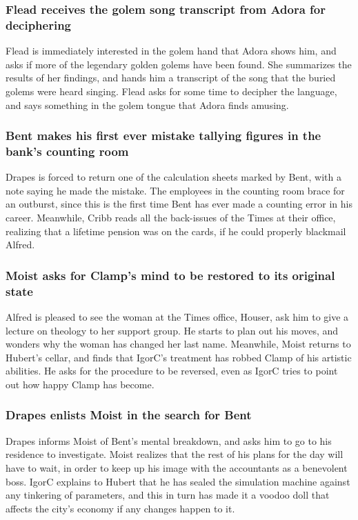 \subsubsection{\Gls{Flead} receives the golem song transcript from \Gls{Adora} for deciphering}
\Gls{Flead} is immediately interested in the golem hand that \Gls{Adora} shows him, and asks if
more of the legendary golden golems have been found. She summarizes the results of her findings,
and hands him a transcript of the song that the buried golems were heard singing. \Gls{Flead} asks
for some time to decipher the language, and says something in the golem tongue that \Gls{Adora}
finds amusing.

\subsubsection{\Gls{Bent} makes his first ever mistake tallying figures in the bank's counting room}
\Gls{Drapes} is forced to return one of the calculation sheets marked by \Gls{Bent}, with a note
saying he made the mistake. The employees in the counting room brace for an outburst, since this is
the first time \Gls{Bent} has ever made a counting error in his career. Meanwhile, \Gls{Cribb}
reads all the back-issues of the Times at their office, realizing that a lifetime pension was on the
cards, if he could properly blackmail \Gls{Alfred}.

\subsubsection{\Gls{Moist} asks for \Gls{Clamp}'s mind to be restored to its original state}
\Gls{Alfred} is pleased to see the woman at the Times office, \Gls{Houser}, ask him to give a
lecture on theology to her support group. He starts to plan out his moves, and wonders why the
woman has changed her last name. Meanwhile, \Gls{Moist} returns to \Gls{Hubert}'s cellar, and
finds that \Gls{IgorC}'s treatment has robbed \Gls{Clamp} of his artistic abilities. He asks for the
procedure to be reversed, even as \Gls{IgorC} tries to point out how happy \Gls{Clamp} has become.

\subsubsection{\Gls{Drapes} enlists \Gls{Moist} in the search for \Gls{Bent}}
\Gls{Drapes} informs \Gls{Moist} of \Gls{Bent}'s mental breakdown, and asks him to go to his
residence to investigate. \Gls{Moist} realizes that the rest of his plans for the day will have to
wait, in order to keep up his image with the accountants as a benevolent boss. \Gls{IgorC} explains
to \Gls{Hubert} that he has sealed the simulation machine against any tinkering of parameters, and
this in turn has made it a voodoo doll that affects the city's economy if any changes happen to it.

